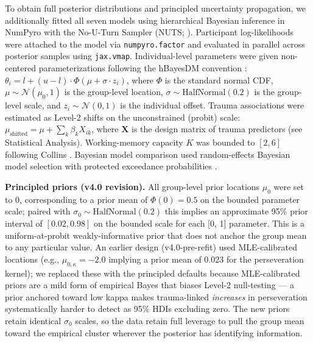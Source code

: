 \documentclass{article}
\begin{document}
To obtain full posterior distributions and principled uncertainty
propagation, we additionally fitted all seven models using hierarchical
Bayesian inference in NumPyro \citep{phan2019composable} with the
No-U-Turn Sampler (NUTS; \citet{hoffman2014no}). Participant
log-likelihoods were attached to the model via \texttt{numpyro.factor}
and evaluated in parallel across posterior samples using
\texttt{jax.vmap}. Individual-level parameters were given non-centered
parameterizations following the hBayesDM convention
\citep{ahn2017revealing}: \(\theta_i = l + (u - l) \cdot \Phi(\mu +
\sigma \cdot z_i)\), where \(\Phi\) is the standard normal CDF,
\(\mu \sim
\mathcal{N}(\mu_0, 1)\) is the group-level location, \(\sigma \sim
\text{HalfNormal}(0.2)\) is the group-level scale, and \(z_i \sim
\mathcal{N}(0, 1)\) is the individual offset. Trauma associations were
estimated as Level-2 shifts on the unconstrained (probit) scale:
\(\mu_{\text{shifted}} = \mu + \sum_k \beta_k X_{ik}\), where
\(\mathbf{X}\) is the design matrix of trauma predictors (see
Statistical Analysis). Working-memory capacity \(K\) was bounded to
\([2, 6]\) following Collins
\citetext{\citeyear{collins2012how}; \citeyear{collins2014working}}.
Bayesian model comparison used random-effects Bayesian model selection
with protected exceedance probabilities
\citep{stephan2009bayesian, rigoux2014bayesian}.

\textbf{Principled priors (v4.0 revision).} All group-level prior
locations \(\mu_0\) were set to 0, corresponding to a prior mean of
\(\Phi(0) = 0.5\) on the bounded parameter scale; paired with
\(\sigma_0 \sim
\text{HalfNormal}(0.2)\) this implies an approximate 95\% prior interval
of \([0.02, 0.98]\) on the bounded scale for each {[}0, 1{]} parameter.
This is a uniform-at-probit weakly-informative prior that does not
anchor the group mean to any particular value. An earlier design
(v4.0-pre-refit) used MLE-calibrated locations (e.g.,
\(\mu_{0,\kappa} = -2.0\) implying a prior mean of 0.023 for the
perseveration kernel); we replaced these with the principled defaults
because MLE-calibrated priors are a mild form of empirical Bayes that
biases Level-2 null-testing --- a prior anchored toward low kappa makes
trauma-linked \emph{increases} in perseveration systematically harder to
detect as 95\% HDIs excluding zero. The new priors retain identical
\(\sigma_0\) scales, so the data retain full leverage to pull the group
mean toward the empirical cluster wherever the posterior has identifying
information.
\end{document}
